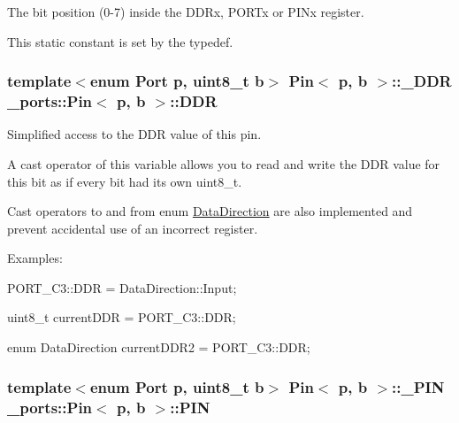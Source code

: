 The bit position (0-\/7) inside the D\+D\+Rx, P\+O\+R\+Tx or P\+I\+Nx register. 

This static constant is set by the typedef. 
\subsubsection[{\texorpdfstring{D\+DR}{DDR}}]{\setlength{\rightskip}{0pt plus 5cm}template$<$enum Port p, uint8\+\_\+t b$>$ {\bf Pin}$<$ p, b $>$\+::{\bf \+\_\+\+D\+DR} {\bf \+\_\+ports\+::\+Pin}$<$ p, b $>$\+::D\+DR\hspace{0.3cm}{\ttfamily [static]}}\hypertarget{struct__ports_1_1Pin_a98b2b6c1bbac0b66435fa91223add866}{}\label{struct__ports_1_1Pin_a98b2b6c1bbac0b66435fa91223add866}


Simplified access to the D\+DR value of this pin. 

A cast operator of this variable allows you to read and write the D\+DR value for this bit as if every bit had its own uint8\+\_\+t.

Cast operators to and from enum \hyperlink{namespace__ports_a20e5153351b42b5fd86473fa045c98ea}{Data\+Direction} are also implemented and prevent accidental use of an incorrect register.

Examples\+:


\begin{DoxyItemize}
\item {\ttfamily P\+O\+R\+T\+\_\+\+C3\+::\+D\+DR = Data\+Direction\+::\+Input;}
\item {\ttfamily uint8\+\_\+t current\+D\+DR = P\+O\+R\+T\+\_\+\+C3\+::\+D\+DR;}
\item {\ttfamily enum Data\+Direction current\+D\+D\+R2 = P\+O\+R\+T\+\_\+\+C3\+::\+D\+DR;} 
\end{DoxyItemize}
\subsubsection[{\texorpdfstring{P\+IN}{PIN}}]{\setlength{\rightskip}{0pt plus 5cm}template$<$enum Port p, uint8\+\_\+t b$>$ {\bf Pin}$<$ p, b $>$\+::{\bf \+\_\+\+P\+IN} {\bf \+\_\+ports\+::\+Pin}$<$ p, b $>$\+::P\+IN\hspace{0.3cm}{\ttfamily [static]}}\hypertarget{struct__ports_1_1Pin_abb249dc14ab80843a95913e7c513dcf9}{}\label{struct__ports_1_1Pin_abb249dc14ab80843a95913e7c513dcf9}


